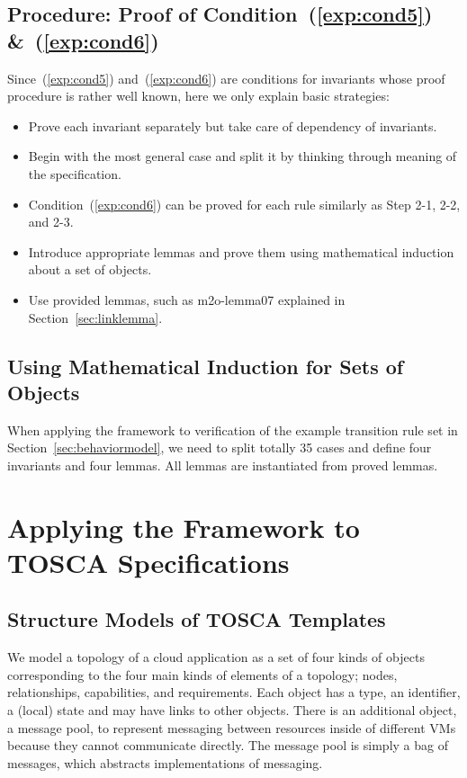\documentclass[12pt]{report}
\begin{document}
\section{Procedure: Proof of Condition~(\ref{exp:cond5}) \&~(\ref{exp:cond6})}
\label{sec:invariant}
Since~(\ref{exp:cond5}) and~(\ref{exp:cond6}) are conditions for invariants whose proof procedure
is rather well known, here we only explain basic strategies:
\begin{itemize}
\item Prove each invariant separately but take care of dependency
  of invariants.
\item Begin with the most general case and split it by thinking
  through meaning of the specification.
\item Condition~(\ref{exp:cond6}) can be proved for each rule similarly as Step
  2-1, 2-2, and 2-3.
\item Introduce appropriate lemmas and prove them using mathematical
  induction about a set of objects.
\item Use provided lemmas, such as m2o-lemma07 explained in
  Section~\ref{sec:linklemma}.
\end{itemize}

\section{Using Mathematical Induction for Sets of Objects}
\label{sec:induction}

When applying the framework to verification of the example transition rule
set in Section~\ref{sec:behaviormodel}, we need to split totally 35
cases and define four invariants and four lemmas.  All lemmas are
instantiated from proved lemmas.

\chapter{Applying the Framework to TOSCA Specifications}
\label{chap:appTOSCA}

\section{Structure Models of TOSCA Templates}
\label{sec:TOSCAstructure}
We model a topology of a cloud application as a set of four kinds of
objects corresponding to the four main kinds of elements of a
topology; nodes, relationships, capabilities, and requirements. Each
object has a type, an identifier, a (local) state and may have links
to other objects. 
There is an additional object, a message pool, to represent messaging
between resources inside of different VMs because they
cannot communicate directly. The message pool is simply a bag of
messages, which abstracts implementations of messaging.
\end{document}
